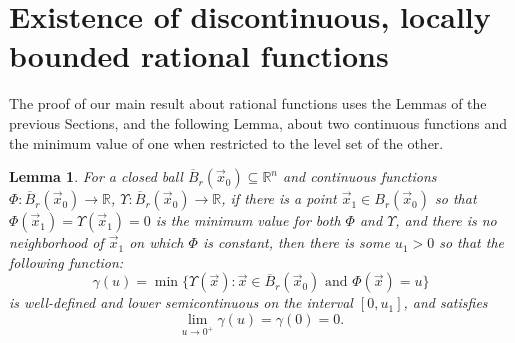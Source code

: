 \documentclass[12pt]{amsart}
\newtheorem{lem}[thm]{Lemma}
\theoremstyle{definition}
\theoremstyle{remark}
\numberwithin{equation}{section}
\newcommand{\re}{\mathbb{R}}
\begin{document}

\section{Existence of discontinuous, locally bounded rational functions}\label{sec2}

The proof of our main result about rational functions uses the Lemmas of the previous Sections, and the following Lemma, about two continuous functions and the minimum value of one when restricted to the level set of the other.

\begin{lem}\label{lem2.10}
  For a closed ball ${\overline B}_r(\vec x_0)\subseteq\re^n$ and continuous functions $\Phi:{\overline B}_r(\vec x_0)\to\re$, $\Upsilon:{\overline B}_r(\vec x_0)\to\re$, if there is a point $\vec x_1\in B_r(\vec x_0)$ so that $\Phi(\vec x_1)=\Upsilon(\vec x_1)=0$ is the minimum value for both $\Phi$ and $\Upsilon$, and there is no neighborhood of $\vec x_1$ on which $\Phi$ is constant, then  there is some $u_1>0$ so that the following function:
   $$\gamma(u)=\min\{\Upsilon(\vec x):\vec x\in {\overline B}_r(\vec x_0)\mbox{\ and\ }\Phi(\vec x)=u\}$$
   is well-defined and lower semicontinuous on the interval $[0,u_1]$, and satisfies $$\displaystyle{\lim_{u\to0^+}\gamma(u)=\gamma(0)=0}.$$
\end{lem}
\end{document}
